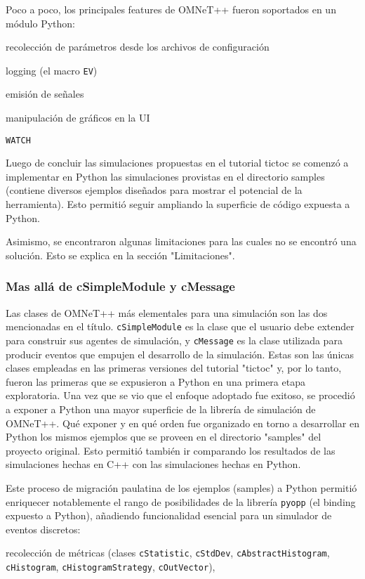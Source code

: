 \documentclass[]{article}
\begin{document}
Poco a poco, los principales features de OMNeT++ fueron soportados en un módulo
Python:

recolección de parámetros desde los archivos de configuración

logging (el macro \verb!EV!)

emisión de señales

manipulación de gráficos en la UI

\verb!WATCH!

Luego de concluir las simulaciones propuestas en el tutorial tictoc se comenzó
a implementar en Python las simulaciones provistas en el directorio samples
(contiene diversos ejemplos diseñados para mostrar el potencial de la
herramienta). Esto permitió seguir ampliando la superficie de código expuesta a
Python.

Asimismo, se encontraron algunas limitaciones para las cuales no se
encontró una solución. Esto se explica en la sección "Limitaciones".

\subsubsection{Mas allá de cSimpleModule y cMessage}

Las clases de OMNeT++ más elementales para una simulación son las dos
mencionadas en el título. \verb!cSimpleModule! es la clase que el usuario debe
extender para construir sus agentes de simulación, y \verb!cMessage! es la clase
utilizada para producir eventos que empujen el desarrollo de la simulación.
Estas son las únicas clases empleadas en las primeras versiones del tutorial
"tictoc" y, por lo tanto, fueron las primeras que se expusieron a Python en una
primera etapa exploratoria. Una vez que se vio que el enfoque adoptado fue
exitoso, se procedió a exponer a Python una mayor superficie de la librería de
simulación de OMNeT++. Qué exponer y en qué orden fue organizado en torno a
desarrollar en Python los mismos ejemplos que se proveen en el directorio
"samples" del proyecto original. Esto permitió también ir comparando los
resultados de las simulaciones hechas en C++ con las simulaciones hechas en
Python.

Este proceso de migración paulatina de los ejemplos (samples) a Python permitió
enriquecer notablemente el rango de posibilidades de la librería \verb!pyopp!
(el binding expuesto a Python), añadiendo funcionalidad esencial para un
simulador de eventos discretos:

recolección de métricas (clases \verb!cStatistic!, \verb!cStdDev!,
\verb!cAbstractHistogram!, \verb!cHistogram!, \verb!cHistogramStrategy!,
\verb!cOutVector!),
\end{document}
